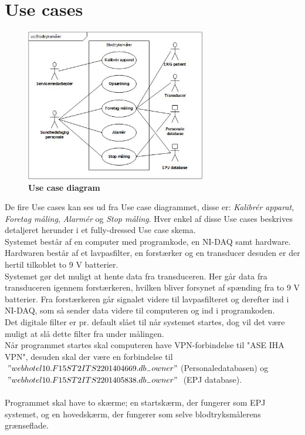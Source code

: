 \section{Use cases}
\begin{figure}[H]
\includegraphics[width =0.7\textwidth , center]{billeder/UseCaseDiagram}
\caption{\textbf{Use case diagram}}
\end{figure}
De fire Use cases kan ses ud fra Use case diagrammet, disse er: \textit{Kalibrér apparat}, \textit{Foretag måling}, \textit{Alarmér} og \textit{Stop måling}. Hver enkel af disse Use cases beskrives detaljeret herunder i et fully-dressed Use case skema.\\
Systemet består af en computer med programkode, en NI-DAQ samt hardware. Hardwaren består af et lavpasfilter, en forstærker og en transducer desuden er der hertil tilkoblet to 9 V batterier.
\\
Systemet gør det muligt at hente data fra transduceren. Her går data fra transduceren igennem forstærkeren, hvilken bliver forsynet af spænding fra to 9 V batterier. Fra forstærkeren går signalet videre til lavpasfilteret og derefter ind i NI-DAQ, som så sender data videre til computeren og ind i programkoden. 
\\ 
Det digitale filter er pr. default slået til når systemet startes, dog vil det være muligt at slå dette filter fra under målingen.\\
Når programmet startes skal computeren have VPN-forbindelse til "ASE IHA VPN", desuden skal der være en forbindelse til $"webhotel10.F15ST2ITS2201404669.db_{-}owner"$(Personaledatabasen) og $"webhotel10.F15ST2ITS2201405838.db_{-}owner"$ (EPJ database).\\\\
Programmet skal have to skærme; en startskærm, der fungerer som EPJ systemet, og en hovedskærm, der fungerer som selve blodtryksmålerens grænseflade.

